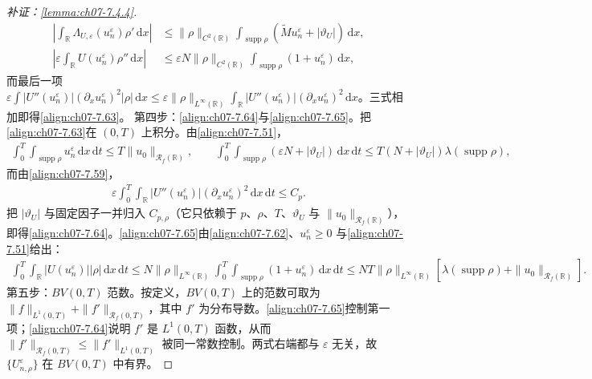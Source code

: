 ﻿\documentclass[../../main.tex]{subfiles}%
\begin{document}
\begin{proof}[补证：\cref{lemma:ch07-7.4.4}]
\begin{align*}
\left|\int_{\mathbb{R}}\Lambda_{U,\varepsilon}(u_n^\varepsilon)\rho'\,\mathrm{d}x\right|
&\leqslant\|\rho\|_{C^2(\mathbb{R})}\int_{\operatorname{supp}\rho}(\widetilde Mu_n^\varepsilon+|\vartheta_U|)\,\mathrm{d}x,\\
\left|\varepsilon\int_{\mathbb{R}}U(u_n^\varepsilon)\rho''\,\mathrm{d}x\right|
&\leqslant\varepsilon N\|\rho\|_{C^2(\mathbb{R})}\int_{\operatorname{supp}\rho}(1+u_n^\varepsilon)\,\mathrm{d}x,
\end{align*}
而最后一项 $\varepsilon\int|U''(u_n^\varepsilon)|(\partial_xu_n^\varepsilon)^2|\rho|\,\mathrm{d}x\leqslant\varepsilon\|\rho\|_{L^\infty(\mathbb{R})}\int_{\mathbb{R}}|U''(u_n^\varepsilon)|(\partial_xu_n^\varepsilon)^2\,\mathrm{d}x$。三式相加即得\eqref{align:ch07-7.63}。
第四步：\eqref{align:ch07-7.64}与\eqref{align:ch07-7.65}。把\eqref{align:ch07-7.63}在 $(0,T)$ 上积分。由\eqref{align:ch07-7.51}，
\begin{align*}
\int_0^T\int_{\operatorname{supp}\rho}u_n^\varepsilon\,\mathrm{d}x\,\mathrm{d}t\leqslant T\|u_0\|_{\mathscr{R}_f(\mathbb{R})},\qquad
\int_0^T\int_{\operatorname{supp}\rho}(\varepsilon N+|\vartheta_U|)\,\mathrm{d}x\,\mathrm{d}t\leqslant T(N+|\vartheta_U|)\lambda(\operatorname{supp}\rho),
\end{align*}
而由\eqref{align:ch07-7.59}，
\begin{align*}
\varepsilon\int_0^T\int_{\mathbb{R}}|U''(u_n^\varepsilon)|(\partial_xu_n^\varepsilon)^2\,\mathrm{d}x\,\mathrm{d}t\leqslant C_p.
\end{align*}
把 $|\vartheta_U|$ 与固定因子一并归入 $C_{p,\rho}$（它只依赖于 $p$、$\rho$、$T$、$\vartheta_U$ 与 $\|u_0\|_{\mathscr{R}_f(\mathbb{R})}$），即得\eqref{align:ch07-7.64}。\eqref{align:ch07-7.65}由\eqref{align:ch07-7.62}、$u_n^\varepsilon\geqslant0$ 与\eqref{align:ch07-7.51}给出：
\begin{align*}
\int_0^T\int_{\mathbb{R}}|U(u_n^\varepsilon)||\rho|\,\mathrm{d}x\,\mathrm{d}t
\leqslant N\|\rho\|_{L^\infty(\mathbb{R})}\int_0^T\int_{\operatorname{supp}\rho}(1+u_n^\varepsilon)\,\mathrm{d}x\,\mathrm{d}t
\leqslant NT\|\rho\|_{L^\infty(\mathbb{R})}[\lambda(\operatorname{supp}\rho)+\|u_0\|_{\mathscr{R}_f(\mathbb{R})}].
\end{align*}
第五步：$BV(0,T)$ 范数。按定义，$BV(0,T)$ 上的范数可取为 $\|f\|_{L^1(0,T)}+\|f'\|_{\mathscr{R}_f(0,T)}$，其中 $f'$ 为分布导数。\eqref{align:ch07-7.65}控制第一项；\eqref{align:ch07-7.64}说明 $f'$ 是 $L^1(0,T)$ 函数，从而 $\|f'\|_{\mathscr{R}_f(0,T)}\leqslant\|f'\|_{L^1(0,T)}$ 被同一常数控制。两式右端都与 $\varepsilon$ 无关，故 $\{U_{n,\rho}^\varepsilon\}$ 在 $BV(0,T)$ 中有界。
\end{proof}
\end{document}

